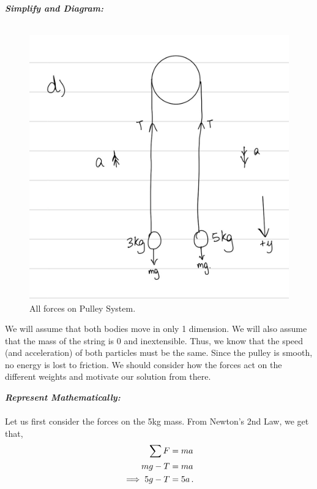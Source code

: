 \begin{subquestions}
\textbf{\textit{Simplify and Diagram:}} \\ \\
\begin{figure}[H]
	\begin{center}
		\includegraphics[scale=0.25]{../2015/figures/2015q6-4}
		\caption{\label{2015:q6:fig:Diagram4} All forces on Pulley System.}
	\end{center}
\end{figure}
We will assume that both bodies move in only 1 dimension. We will also assume that the mass of the string is 0 and inextensible. Thus, we know that the speed (and acceleration) of both particles must be the same. Since the pulley is smooth, no energy is lost to friction. We should consider how the forces act on the different weights and motivate our solution from there.




\textbf{\textit{Represent Mathematically:}} \\ \\ 
Let us first consider the forces on the 5kg mass. From Newton's 2nd Law, we get that,
\begin{align}
	\sum F & = ma \nonumber \\
	mg - T & = ma \nonumber \\
	\implies 5g-T & = 5a \,. \label{2015:q6:PulleyEq1}
\end{align}


\end{subquestions}
